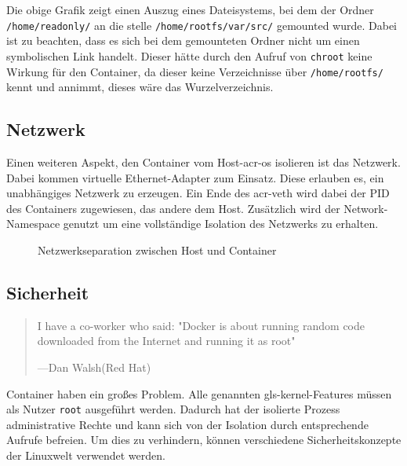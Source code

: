 Die obige Grafik zeigt einen Auszug eines Dateisystems, bei dem der Ordner \texttt{/home/readonly/} an die stelle \texttt{/home/rootfs/var/src/} gemounted wurde. Dabei ist zu beachten, dass es sich bei dem gemounteten Ordner nicht um einen symbolischen Link handelt. Dieser hätte durch den Aufruf von \texttt{chroot} keine Wirkung für den Container, da dieser keine Verzeichnisse über \texttt{/home/rootfs/} kennt und annimmt, dieses wäre das Wurzelverzeichnis.

\subsection{Netzwerk}
\label{sec:netzwerk}

Einen weiteren Aspekt, den Container vom Host-\gls{acr-os} isolieren ist das Netzwerk. Dabei kommen virtuelle Ethernet-Adapter zum Einsatz. Diese erlauben es, ein unabhängiges Netzwerk zu erzeugen. Ein Ende des \gls{acr-veth} wird dabei der PID des Containers zugewiesen, das andere dem Host. Zusätzlich wird der Network-Namespace genutzt um eine vollständige Isolation des Netzwerks zu erhalten.

\begin{figure}[h]
	\begin{center}
		\caption{Netzwerkseparation zwischen Host und Container}
		\label{fig:networkContainer}
	\end{center}
\end{figure}

\subsection{Sicherheit}
\label{sec:sicherheit}
\begin{quote}
	I have a co-worker who said: "Docker is about running random code downloaded from the Internet and running it as root"
	\begin{flushright}
		\small{---Dan Walsh(Red Hat)}
	\end{flushright}
\end{quote}

Container haben ein großes Problem. Alle genannten \gls{gls-kernel}-Features müssen als Nutzer \texttt{root} ausgeführt werden. Dadurch hat der isolierte Prozess administrative Rechte und kann sich von der Isolation durch entsprechende Aufrufe befreien. Um dies zu verhindern, können verschiedene Sicherheitskonzepte der Linuxwelt verwendet werden.

